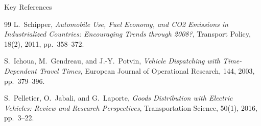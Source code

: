 \documentclass[aspectratio=169,10pt]{beamer}
\begin{document}
\begin{frame}[allowframebreaks]{Key References}
\begin{thebibliography}{99}
    L.\ Schipper,
    \emph{Automobile Use, Fuel Economy, and CO2 Emissions in Industrialized
    Countries: Encouraging Trends through 2008?},
    Transport Policy, 18(2), 2011, pp.\ 358--372.

    S.\ Ichoua, M.\ Gendreau, and J.-Y.\ Potvin,
    \emph{Vehicle Dispatching with Time-Dependent Travel Times},
    European Journal of Operational Research, 144, 2003, pp.\ 379--396.

    S.\ Pelletier, O.\ Jabali, and G.\ Laporte,
    \emph{Goods Distribution with Electric Vehicles: Review and Research
    Perspectives},
    Transportation Science, 50(1), 2016, pp.\ 3--22.
  \end{thebibliography}

\end{frame}
\end{document}
